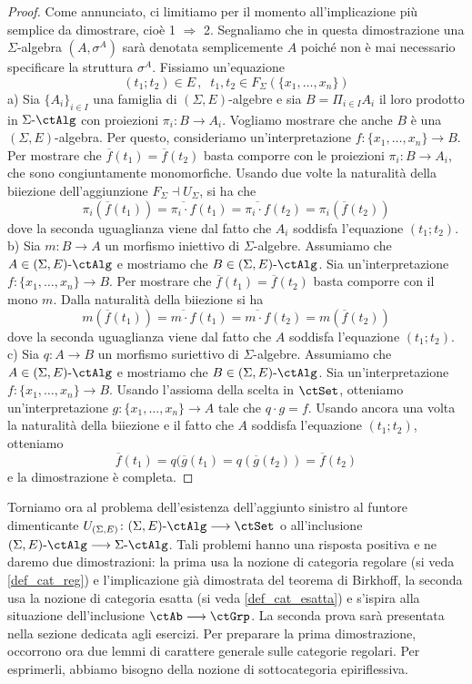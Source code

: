 \begin{proof}
 Come annunciato, ci limitiamo per il momento all'implicazione più semplice da dimostrare, cioè 1 \(\Rightarrow\) 2.
 Segnaliamo che in questa dimostrazione una \(\Sigma\)-algebra \((A,\sigma^A)\) sarà denotata semplicemente \(A\)
 poiché non è mai necessario specificare la struttura \(\sigma^A\). Fissiamo un'equazione
 \[(t_1;t_2) \in E \,,\;\; t_1,t_2 \in F_{\Sigma}(\{x_1,\ldots,x_n\})\]
 a) Sia \(\{A_i\}_{i \in I}\) una famiglia di \((\Sigma,E)\)-algebre e sia \(B = \Pi_{i \in I}A_i\) il loro prodotto in \(\ctSAlg\)
 con proiezioni \(\pi_i \colon B \to A_i\). Vogliamo mostrare che anche \(B\) è una \((\Sigma,E)\)-algebra. Per questo,
 consideriamo un'interpretazione \(f \colon \{x_1,\ldots,x_n\} \to B\). Per mostrare che \(\overline{f}(t_1) = \overline{f}(t_2)\)
 basta comporre con le proiezioni \(\pi_i \colon B \to A_i\), che sono congiuntamente monomorfiche. Usando due
 volte la naturalità della biiezione dell'aggiunzione \(F_{\Sigma} \dashv U_{\Sigma}\), si ha che
 \[\pi_i(\overline{f}(t_1)) = \overline{\pi_i \cdot f}(t_1) = \overline{\pi_i \cdot f}(t_2) = \pi_i(\overline{f}(t_2))\]
 dove la seconda uguaglianza viene dal fatto che \(A_i\) soddisfa l'equazione \((t_1;t_2)\). \\
 b) Sia \(m \colon B \to A\) un morfismo iniettivo di \(\Sigma\)-algebre. Assumiamo che \(A \in \ctSEAlg\) e mostriamo che
 \(B \in \ctSEAlg\). Sia un'interpretazione \(f \colon \{x_1,\ldots,x_n\} \to B\). Per mostrare che \(\overline{f}(t_1) = \overline{f}(t_2)\)
 basta comporre con il mono \(m\). Dalla naturalità della biiezione si ha
 \[m(\overline{f}(t_1)) = \overline{m \cdot f}(t_1) = \overline{m \cdot f}(t_2) = m(\overline{f}(t_2))\]
 dove la seconda uguaglianza viene dal fatto che \(A\) soddisfa l'equazione \((t_1;t_2)\). \\
 c) Sia \(q \colon A \to B\) un morfismo suriettivo di \(\Sigma\)-algebre. Assumiamo che \(A \in \ctSEAlg\) e mostriamo che
 \(B \in \ctSEAlg\). Sia un'interpretazione \(f \colon \{x_1,\ldots,x_n\} \to B\). Usando l'assioma della scelta in \(\ctSet\), otteniamo
 un'interpretazione \(g \colon \{x_1,\ldots,x_n\} \to A\) tale che \(q \cdot g = f\). Usando ancora una volta la naturalità della biiezione
 e il fatto che \(A\) soddisfa l'equazione \((t_1;t_2)\), otteniamo
 \[\overline{f}(t_1) = q(\overline{g}(t_1) = q(\overline{g}(t_2)) = \overline{f}(t_2)\]
 e la dimostrazione è completa.
\end{proof}

Torniamo ora al problema dell'esistenza dell'aggiunto sinistro al funtore dimenticante \(U_{(\Sigma,E)} \colon \ctSEAlg \fun \ctSet\)
o all'inclusione \(\ctSEAlg \fun \ctSAlg\). Tali problemi hanno una risposta positiva e ne daremo due dimostrazioni: la prima usa la
nozione di categoria regolare (si veda \ref{def_cat_reg}) e l'implicazione già dimostrata del teorema di Birkhoff, la seconda
usa la nozione di categoria esatta (si veda \ref{def_cat_esatta}) e s'ispira alla situazione dell'inclusione \(\ctAb \fun \ctGrp\).
La seconda prova sarà presentata nella sezione dedicata agli esercizi. Per preparare la prima dimostrazione, occorrono ora due
lemmi di carattere generale sulle categorie regolari. Per esprimerli, abbiamo bisogno della nozione di sottocategoria epiriflessiva.

